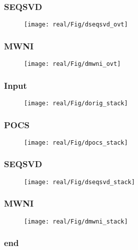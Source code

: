 \begin{frame} \frametitle{SEQSVD}
    \begin{figure}[ht]
    \centering
    \texttt{[image: real/Fig/dseqsvd\_ovt]}
    \end{figure}
\end{frame}

\begin{frame} \frametitle{MWNI}
    \begin{figure}[ht]
    \centering
    \texttt{[image: real/Fig/dmwni\_ovt]}
    \end{figure}
\end{frame}

\begin{frame} \frametitle{Input}
    \begin{figure}[ht]
    \centering
    \texttt{[image: real/Fig/dorig\_stack]}
    \end{figure}
\end{frame}

\begin{frame} \frametitle{POCS}
    \begin{figure}[ht]
    \centering
    \texttt{[image: real/Fig/dpocs\_stack]}
    \end{figure}
\end{frame}

\begin{frame} \frametitle{SEQSVD}
    \begin{figure}[ht]
    \centering
    \texttt{[image: real/Fig/dseqsvd\_stack]}
    \end{figure}
\end{frame}

\begin{frame} \frametitle{MWNI}
    \begin{figure}[ht]
    \centering
    \texttt{[image: real/Fig/dmwni\_stack]}
    \end{figure}
\end{frame}

\begin{frame} \frametitle{end}

\end{frame}


